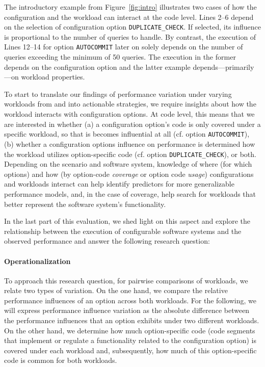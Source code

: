 The introductory example from Figure~\ref{fig:intro} illustrates two cases of how the configuration and the workload can interact at the code level. \colorbox{duplicatecheck}{Lines 2--6} depend on the selection of configuration option \texttt{DUPLICATE\_CHECK}. If selected, its influence is proportional to the number of queries to handle. 
By contrast, the execution of \colorbox{autocommit}{Lines 12--14} for option \texttt{AUTOCOMMIT} later on solely depends on the number of queries exceeding the minimum of 50 queries. The execution in the former depends on the configuration option and the latter example depends---primarily---on workload properties. 

To start to translate our findings of performance variation under varying workloads from  and  into actionable strategies, we require insights about how the workload interacts with configuration options. At code level, this means that we are interested in whether (a) a configuration option’s code is only covered under a specific workload, so that is becomes influential at all (cf. option \texttt{AUTOCOMMIT}), (b) whether a configuration options influence on performance is determined how the workload utilizes option-specific code (cf. option \texttt{DUPLICATE\_CHECK}), or both. Depending on the scenario and software system, knowledge of where (for which options) and how (by option-code \textit{coverage} or option code \textit{usage}) configurations and workloads interact can help identify predictors for more generalizable performance models, and, in the case of coverage, help search for workloads that better represent the software system's functionality.


In the last part of this evaluation, we shed light on this aspect and explore the relationship between the execution of configurable software systems and the observed performance and answer the following research question:


\paragraph*{Operationalization}
To approach this research question, for pairwise comparisons of workloads, we relate two types of variation. On the one hand, we compare the relative performance influences of an option across both workloads. For the following, we will express performance influence variation as the absolute difference between the performance influences that an option exhibits under two different workloads. On the other hand, we determine how much option-specific code (code segments that implement or regulate a functionality related to the configuration option) is covered under each workload and, subsequently, how much of this option-specific code is common for both workloads.

